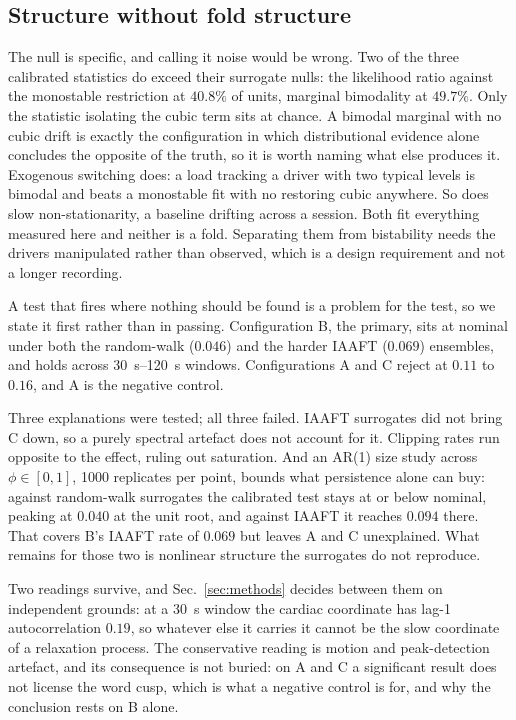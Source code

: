 \documentclass[conference]{IEEEtran}
\begin{document}
\subsection{Structure without fold structure}
The null is specific, and calling it noise would be wrong. Two of the three
calibrated statistics do exceed their surrogate nulls: the likelihood ratio
against the monostable restriction at $40.8\%$ of units, marginal bimodality at
$49.7\%$. Only the statistic isolating the cubic term sits at chance. A bimodal marginal with no cubic drift is exactly the configuration in which
distributional evidence alone concludes the opposite of the truth, so it is
worth naming what else produces it. Exogenous switching does: a load tracking a
driver with two typical levels is bimodal and beats a monostable fit with no
restoring cubic anywhere. So does slow non-stationarity, a baseline drifting
across a session. Both fit everything measured here and neither is a fold.
Separating them from bistability needs the drivers manipulated rather than
observed, which is a design requirement and not a longer recording.

A test that fires where nothing should be found is a problem for the test, so
we state it first rather than in passing. Configuration B, the primary, sits at
nominal under both the random-walk ($0.046$) and the harder IAAFT ($0.069$)
ensembles, and holds across \SIrange{30}{120}{\second} windows. Configurations
A and C reject at $0.11$ to $0.16$, and A is the negative control.

Three explanations were tested; all three failed. IAAFT surrogates did not
bring C down, so a purely spectral artefact does not account for it. Clipping rates run opposite to the effect, ruling out saturation. And an AR(1)
size study across $\phi\in[0,1]$, 1000 replicates per point, bounds what
persistence alone can buy: against random-walk surrogates the calibrated test
stays at or below nominal, peaking at $0.040$ at the unit root, and against
IAAFT it reaches $0.094$ there. That covers B's IAAFT rate of $0.069$ but
leaves A and C unexplained. What remains for those two is nonlinear structure
the surrogates do not reproduce.

Two readings survive, and Sec.~\ref{sec:methods} decides between them on
independent grounds: at a \SI{30}{\second} window the cardiac coordinate has
lag-1 autocorrelation $0.19$, so whatever else it carries it cannot be the slow
coordinate of a relaxation process. The conservative reading is motion and peak-detection artefact, and its
consequence is not buried: on A and C a significant result does not license the
word cusp, which is what a negative control is for, and why the conclusion
rests on B alone.
\end{document}
